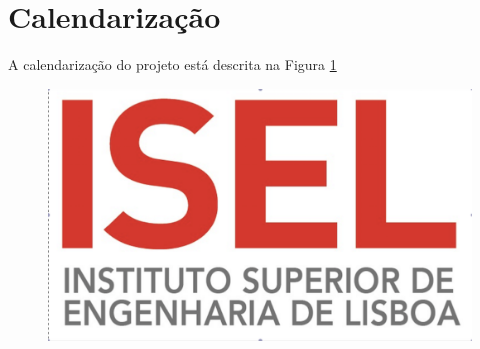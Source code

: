 \documentclass[12pt,a4paper]{article}
\begin{document}
\section{Calendarização}
A calendarização do projeto está descrita na Figura \ref{fig2}
\begin{figure}[!p]
    \centering
    \begin{minipage}[c][\textheight]{393pt}
        \vfill
	\begin{center}
        \includegraphics[scale=0.7,angle=90]{imgs/LOGO_principalGrande}
	\end{center}
	\vfill
    \end{minipage}
    \hspace{2pt}
    \begin{minipage}[c][\textheight]{22.5pt}
        \label{fig2}
    \end{minipage}
\end{figure}






\end{document}
